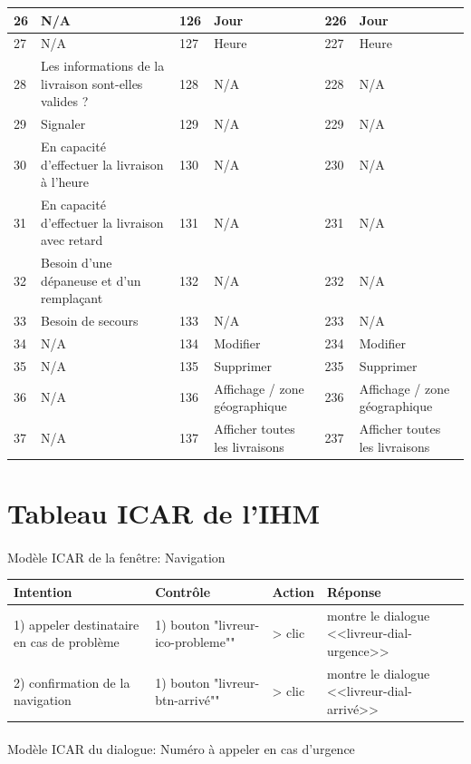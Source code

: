 \documentclass{report}
\begin{document}
\begin{longtable}{|p{0.5cm}|p{3.5cm}|p{0.5cm}|p{3.5cm}|p{0.5cm}|p{3.5cm}|}
26&N/A&126&Jour&226&Jour\\\hline
27&N/A&127&Heure&227&Heure\\\hline
28&Les informations de la livraison sont-elles valides ?&128&N/A&228&N/A\\\hline
29&Signaler&129&N/A&229&N/A\\\hline
30&En capacité d'effectuer la livraison à l'heure&130&N/A&230&N/A\\\hline
31&En capacité d'effectuer la livraison avec retard&131&N/A&231&N/A\\\hline
32&Besoin d'une dépaneuse et d'un remplaçant&132&N/A&232&N/A\\\hline
33&Besoin de secours&133&N/A&233&N/A\\\hline
34&N/A&134&Modifier&234&Modifier\\\hline
35&N/A&135&Supprimer&235&Supprimer\\\hline
36&N/A&136&Affichage / zone géographique&236&Affichage / zone géographique\\\hline
37&N/A&137&Afficher toutes les livraisons&237&Afficher toutes les livraisons\\\hline

\end{longtable}

\pagebreak

\section{Tableau ICAR de l'IHM}


\paragraph{}
Modèle ICAR de la fenêtre: Navigation

\begin{longtable}{|p{3cm}|p{4cm}|p{2cm}|p{5cm}|}
\hline
Intention&Contrôle&Action&Réponse\\\hline
1) appeler destinataire en cas de problème&1) bouton \newline
"livreur-ico-probleme""&> clic&montre le dialogue <<livreur-dial-urgence>>\\\hline
2) confirmation de la navigation&1) bouton \newline
"livreur-btn-arrivé""&> clic&montre le dialogue <<livreur-dial-arrivé>>\\\hline
\end{longtable}

\paragraph{}
Modèle ICAR du dialogue: Numéro à appeler en cas d'urgence
\end{document}
